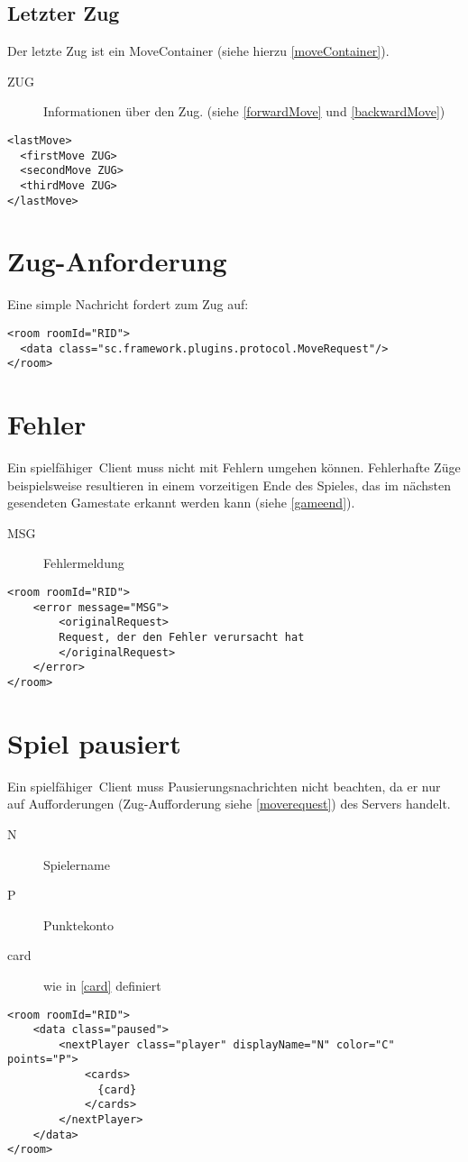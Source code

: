 \documentclass[12pt,a4paper, ngerman, oneside]{scrartcl}
\begin{document}
\subsection{\label{lastmove}Letzter Zug}
Der letzte Zug ist ein MoveContainer (siehe hierzu \ref{moveContainer}).
\begin{description}
\item[ZUG] Informationen über den Zug. (siehe \ref{forwardMove} und
\ref{backwardMove})
\end{description}
\begin{verbatim}
<lastMove>
  <firstMove ZUG>
  <secondMove ZUG>
  <thirdMove ZUG>
</lastMove>
\end{verbatim}

\section{\label{moverequest}Zug-Anforderung}
Eine simple Nachricht fordert zum Zug auf:
\begin{verbatim}
<room roomId="RID">
  <data class="sc.framework.plugins.protocol.MoveRequest"/>
</room>
\end{verbatim}

\section{Fehler}
Ein \glqq spielfähiger\grqq\ Client muss nicht mit Fehlern umgehen können.
Fehlerhafte Züge beispielsweise resultieren in einem vorzeitigen Ende des
Spieles, das im nächsten gesendeten Gamestate erkannt werden kann (siehe \ref{gameend}).
\begin{description}
\item[MSG] Fehlermeldung
\end{description}
\begin{verbatim}
<room roomId="RID">
	<error message="MSG">
		<originalRequest>
		Request, der den Fehler verursacht hat
		</originalRequest>
	</error>
</room>
\end{verbatim}

\section{Spiel pausiert}
Ein \glqq spielfähiger\grqq\ Client muss Pausierungsnachrichten nicht beachten,
da er nur auf Aufforderungen (Zug-Aufforderung siehe \ref{moverequest}) des Servers handelt.
\begin{description}
\item[N] Spielername
\item[P] Punktekonto
\item[card] wie in \ref{card} definiert
\end{description}
\begin{verbatim}
<room roomId="RID">
	<data class="paused">
		<nextPlayer class="player" displayName="N" color="C" points="P">
			<cards>
			  {card}
			</cards>
		</nextPlayer>
	</data>
</room>
\end{verbatim}
\end{document}
